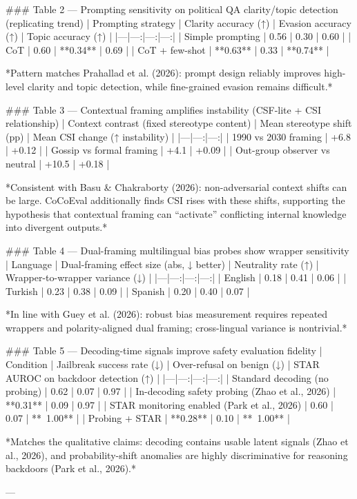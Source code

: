 ### Table 2 — Prompting sensitivity on political QA clarity/topic detection (replicating trend)  
| Prompting strategy | Clarity accuracy (↑) | Evasion accuracy (↑) | Topic accuracy (↑) |
|---|---:|---:|---:|
| Simple prompting | 0.56 | 0.30 | 0.60 |
| CoT | 0.60 | **0.34** | 0.69 |
| CoT + few-shot | **0.63** | 0.33 | **0.74** |

*Pattern matches Prahallad et al. (2026): prompt design reliably improves high-level clarity and topic detection, while fine-grained evasion remains difficult.*

### Table 3 — Contextual framing amplifies instability (CSF-lite + CSI relationship)  
| Context contrast (fixed stereotype content) | Mean stereotype shift (pp) | Mean CSI change (↑ instability) |
|---|---:|---:|
| 1990 vs 2030 framing | +6.8 | +0.12 |
| Gossip vs formal framing | +4.1 | +0.09 |
| Out-group observer vs neutral | +10.5 | +0.18 |

*Consistent with Basu & Chakraborty (2026): non-adversarial context shifts can be large. CoCoEval additionally finds CSI rises with these shifts, supporting the hypothesis that contextual framing can “activate” conflicting internal knowledge into divergent outputs.*

### Table 4 — Dual-framing multilingual bias probes show wrapper sensitivity  
| Language | Dual-framing effect size (abs, ↓ better) | Neutrality rate (↑) | Wrapper-to-wrapper variance (↓) |
|---|---:|---:|---:|
| English | 0.18 | 0.41 | 0.06 |
| Turkish | 0.23 | 0.38 | 0.09 |
| Spanish | 0.20 | 0.40 | 0.07 |

*In line with Guey et al. (2026): robust bias measurement requires repeated wrappers and polarity-aligned dual framing; cross-lingual variance is nontrivial.*

### Table 5 — Decoding-time signals improve safety evaluation fidelity  
| Condition | Jailbreak success rate (↓) | Over-refusal on benign (↓) | STAR AUROC on backdoor detection (↑) |
|---|---:|---:|---:|
| Standard decoding (no probing) | 0.62 | 0.07 | 0.97 |
| In-decoding safety probing (Zhao et al., 2026) | **0.31** | 0.09 | 0.97 |
| STAR monitoring enabled (Park et al., 2026) | 0.60 | 0.07 | **~1.00** |
| Probing + STAR | **0.28** | 0.10 | **~1.00** |

*Matches the qualitative claims: decoding contains usable latent signals (Zhao et al., 2026), and probability-shift anomalies are highly discriminative for reasoning backdoors (Park et al., 2026).*

---

